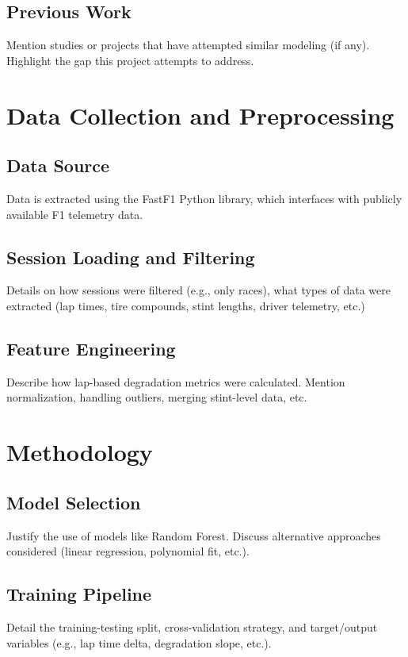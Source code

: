 \documentclass[12pt]{article}
\begin{document}
\subsection{Previous Work}
Mention studies or projects that have attempted similar modeling (if any). Highlight the gap this project attempts to address.

\section{Data Collection and Preprocessing}
\subsection{Data Source}
Data is extracted using the FastF1 Python library, which interfaces with publicly available F1 telemetry data.

\subsection{Session Loading and Filtering}
Details on how sessions were filtered (e.g., only races), what types of data were extracted (lap times, tire compounds, stint lengths, driver telemetry, etc.)

\subsection{Feature Engineering}
Describe how lap-based degradation metrics were calculated. Mention normalization, handling outliers, merging stint-level data, etc.

\section{Methodology}
\subsection{Model Selection}
Justify the use of models like Random Forest. Discuss alternative approaches considered (linear regression, polynomial fit, etc.).

\subsection{Training Pipeline}
Detail the training-testing split, cross-validation strategy, and target/output variables (e.g., lap time delta, degradation slope, etc.).
\end{document}
